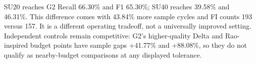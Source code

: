 SU20 reaches G2 Recall 66.30\% and F1 65.30\%; SU40 reaches 39.58\% and 46.31\%. This difference comes with 43.84\% more sample cycles and FI counts 193 versus 157. It is a different operating tradeoff, not a universally improved setting. Independent controls remain competitive: G2's higher-quality Delta and Rao-inspired budget points have sample gaps +41.77\% and +88.08\%, so they do not qualify as nearby-budget comparisons at any displayed tolerance.
